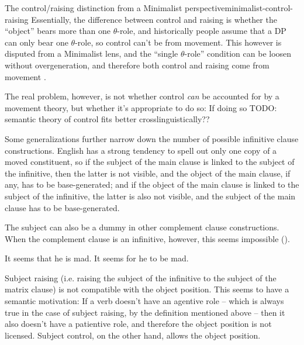 \documentclass[UTF8, a4paper, oneside, scheme=plain, 12pt]{ctexbook}
\begin{document}
\begin{theorybox}{The control/raising distinction from a Minimalist perspective}{minimalist-control-raising}
    Essentially, the difference between control and raising is 
    whether the ``object'' bears more than one $\theta$-role,
    and historically people assume that a DP can only bear one $\theta$-role,
    so control can't be from movement.
    This however is disputed from a Minimalist lens,
    and the ``single $\theta$-role'' condition 
    can be loosen without overgeneration,
    and therefore both control and raising come from movement
    \citet{hornstein1999movement}. 

    The real problem, however, is not whether control \emph{can} be accounted for 
    by a movement theory, 
    but whether it's appropriate to do so:
    If doing so TODO: semantic theory of control fits better crosslinguistically??
\end{theorybox}

Some generalizations further narrow down 
the number of possible infinitive clause constructions.
English has a strong tendency to spell out only one copy of a moved constituent,
so if the subject of the main clause is linked to the subject of the infinitive,
then the latter is not visible,
and the object of the main clause, if any, has to be base-generated;
and if the object of the main clause is linked to the subject of the infinitive,
the latter is also not visible,
and the subject of the main clause has to be base-generated.

The subject can also be a dummy in other complement clause constructions.
When the complement clause is an infinitive, however, 
this seems impossible ().

\begin{exe}
    \ex\label{ex:complement.infinitive.no-dummy-subject}  \begin{xlist}
        \ex It seems that he is mad.
        \ex *It seems for he to be mad.
    \end{xlist}
\end{exe}

Subject raising (i.e. raising the subject of the infinitive to the subject of the matrix clause) 
is not compatible with the object position.
This seems to have a semantic motivation:
If a verb doesn't have an agentive role -- 
which is always true in the case of subject raising,
by the definition mentioned above -- 
then it also doesn't have a patientive role,
and therefore the object position is not licensed.
Subject control, on the other hand, allows the object position.
\end{document}
